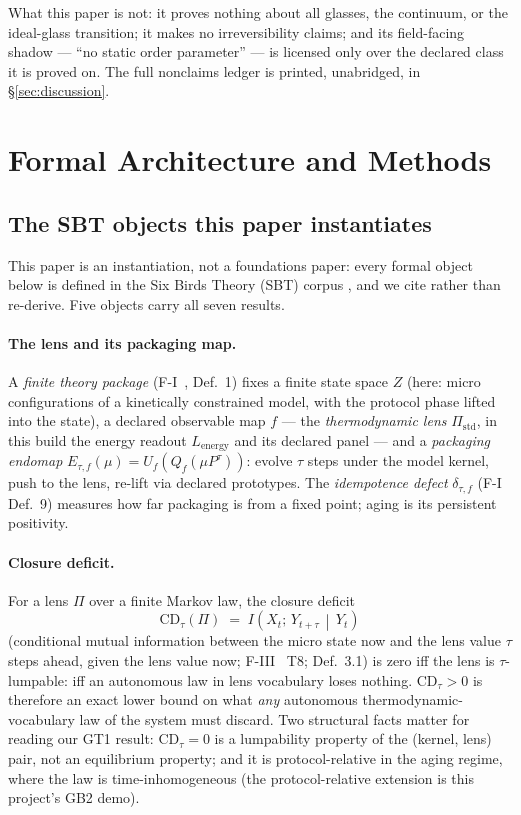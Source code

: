 \documentclass[11pt]{article}
\newcommand{\sbtcite}[1]{\cite{#1}}
\theoremstyle{definition}
\begin{document}
What this paper is not: it proves nothing about all glasses, the continuum, or the ideal-glass
transition; it makes no irreversibility claims; and its field-facing shadow --- ``no static order
parameter'' --- is licensed only over the declared class it is proved on. The full nonclaims
ledger is printed, unabridged, in \S\ref{sec:discussion}.
 \section{Formal Architecture and Methods}
\label{sec:methods}


\subsection{The SBT objects this paper instantiates}

This paper is an instantiation, not a foundations paper: every formal object below is defined in
the Six Birds Theory (SBT) corpus \sbtcite{sbt-primer,sbt-foundations-i,sbt-foundations-ii,sbt-foundations-iii,sbt-foundations-iv,sbt-paper-a,sbt-paper-b,sbt-paper-c}, and we cite rather
than re-derive. Five objects carry all seven results.

\paragraph{The lens and its packaging map.} A \emph{finite theory package}
(F-I~\sbtcite{sbt-foundations-i}, Def.~1) fixes a finite state space $Z$ (here: micro
configurations of a kinetically constrained model, with the protocol phase lifted into the state),
a declared observable map $f$ --- the \emph{thermodynamic lens} $\Pi_{\mathrm{std}}$, in this build
the energy readout $L_{\mathrm{energy}}$ and its declared panel --- and a \emph{packaging endomap}
$E_{\tau,f}(\mu) = U_f(Q_f(\mu P^{\tau}))$: evolve $\tau$ steps under the model kernel, push to the
lens, re-lift via declared prototypes. The \emph{idempotence defect} $\delta_{\tau,f}$ (F-I
Def.~9) measures how far packaging is from a fixed point; aging is its persistent positivity.

\paragraph{Closure deficit.} For a lens $\Pi$ over a finite Markov law, the closure deficit
\[
  \mathrm{CD}_{\tau}(\Pi) \;=\; I\!\left(X_t;\, Y_{t+\tau} \,\middle|\, Y_t\right)
\]
(conditional mutual information between the micro state now and the lens value $\tau$ steps ahead,
given the lens value now; F-III~\sbtcite{sbt-foundations-iii} T8; \sbtcite{sbt-paper-b} Def.~3.1)
is zero iff the lens is $\tau$-lumpable: iff an autonomous law in lens vocabulary loses nothing.
$\mathrm{CD}_{\tau}>0$ is therefore an exact lower bound on what \emph{any} autonomous
thermodynamic-vocabulary law of the system must discard. Two structural facts matter for reading
our GT1 result: $\mathrm{CD}_{\tau}=0$ is a lumpability property of the (kernel, lens) pair, not
an equilibrium property; and it is protocol-relative in the aging regime, where the law is
time-inhomogeneous (the protocol-relative extension is this project's GB2 demo).
\end{document}
